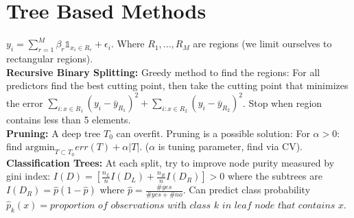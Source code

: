 \section*{Tree Based Methods}
$y_i = \sum_{r=1}^M \beta_r \mathds{1}_{x_i\in R_r} + \epsilon_i$. Where $R_1, ..., R_M$ are regions (we limit ourselves to rectangular regions). \\
\textbf{Recursive Binary Splitting:} Greedy method to find the regions: For all predictors find the best cutting point, then take the cutting point that minimizes the error $\sum_{i: x\in R_1} (y_i - \bar y_{R_1})^2 + \sum_{i: x \in R_2} (y_i - \bar y_{R_2})^2$. Stop when region contains less than 5 elements. \\
\textbf{Pruning:} A deep tree $T_0$ can overfit. Pruning is a possible solution: For $\alpha >0$: find $\text{argmin}_{T\subset T_0} err(T) + \alpha |T|$. ($\alpha$ is tuning parameter, find via CV). \\
\textbf{Classification Trees:} At each split, try to improve node purity measured by gini index: $I(D) = [\frac{n_L}{n} I(D_L) + \frac{n_R}{n} I(D_R)] > 0$ where the subtrees are $I(D_R) = \hat p (1-\hat p)$ where $\hat p = \frac{\#yes}{\#yes + \#no}$. Can predict class probability $\hat p_k(x) = \textit{proportion of observations with class }k\textit{ in leaf node that contains }x$.


